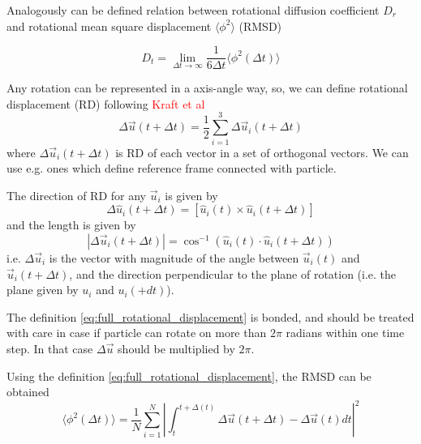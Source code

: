 Analogously can be defined relation between rotational diffusion coefficient $D_r$ and rotational mean square displacement $\langle \phi^2 \rangle$ (RMSD)

\begin{equation}
\label{eq:rotational_diffsion_vs_displacement}
	D_t = \lim_{\Delta t \to \infty} \frac{1}{6 \Delta t} \langle \phi^2(\Delta t)\rangle
\end{equation}

Any rotation can be represented in a axis-angle way, so, we can define rotational displacement (RD) following \textcolor{red}{Kraft et al}
\begin{equation}
\label{eq:full_rotational_displacement}
	\Delta \vec{u}(t + \Delta t) 
		= \frac{1}{2} \sum_{i = 1}^{3} \Delta \vec{u}_i(t + \Delta t)
\end{equation}
where $\Delta \vec{u}_i(t + \Delta t)$ is RD of each vector in a set of orthogonal vectors. We can use e.g. ones which define reference frame connected with particle.

The direction of RD for any $\vec{u}_i$ is given by
\begin{equation}
\label{eq:rot_displ_i_direction}
	\Delta \hat{u}_i(t + \Delta t)
		= [\hat{u}_i(t) \times \hat{u}_i(t + \Delta t)]
\end{equation}
and the length is given by
\begin{equation}
\label{eq:rot_displ_i_magnitude}
	|\Delta \vec{u}_i(t + \Delta	 t)|
		= \cos^{-1}(\hat{u}_i(t) \cdot \hat{u}_i(t + \Delta t))
\end{equation}
i.e. $\Delta \vec{u}_i$ is the vector with magnitude of the angle between $\vec{u}_i(t)$ and $\vec{u}_i(t + \Delta t)$, and the direction perpendicular to the plane of rotation (i.e. the plane given by $u_i$ and $u_i(+dt)$).

The definition \eqref{eq:full_rotational_displacement} is bonded, and should be treated with care in case if particle can rotate on more than $2\pi$ radians within one time step. In that case $\Delta \vec{u}$ should be multiplied by $2 \pi$.

Using the definition \eqref{eq:full_rotational_displacement}, the RMSD can be obtained
\begin{equation}
\label{eq:rotational_mean_square_displacement}
	\langle \phi^2 (\Delta t)\rangle
		= \frac{1}{N} \sum_{i=1}^{N} 
			\left|
				\int_{t}^{t+\Delta(t)}
					\Delta \vec{u}(t + \Delta t) 
					- \Delta \vec{u}(t)
				dt
			\right|^2
\end{equation}

